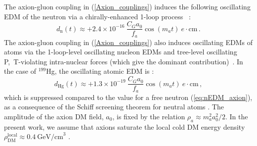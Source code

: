 The axion-gluon coupling in (\ref{Axion_couplings}) induces the following oscillating EDM of the neutron via a chirally-enhanced 1-loop process~%
\cite{tuningfootnote,Witten1979,Witten1979B,Pospelov1999}:
\begin{equation}
\label{eq:nEDM_axion}
d_\mathrm{n}(t) \approx +2.4 \times 10^{-16} ~ \frac{C_G a_0}{f_a} \cos(m_a t) ~ e \cdot \textrm{cm} \, .
\end{equation}
The axion-gluon coupling in (\ref{Axion_couplings}) also induces oscillating EDMs of atoms via the 1-loop-level oscillating nucleon EDMs and tree-level oscillating P,~T-violating intra-nuclear forces (which give the dominant contribution)~\cite{Stadnik2014A,Flambaum1984EDM,Flambaum1984EDMB}.
In the case of $^{199}$Hg, the oscillating atomic EDM is \cite{Stadnik2014A,StadnikThesis,Flambaum1985EDM,Flambaum1985EDMB,Flambaum2002EDM,Dmitriev2003A,Dmitriev2003B,Dmitriev2005,Engel2005,Engel2010}:
\begin{equation}
\label{199Hg-EDM_axion}
d_{\textrm{Hg}}(t) \approx +1.3 \times 10^{-19} ~ \frac{C_G a_0}{f_a} \cos(m_a t) ~ e \cdot \textrm{cm} \, ,
\end{equation}
which is suppressed compared to the value for a free neutron (\ref{eq:nEDM_axion}), as a consequence of the Schiff screening theorem for neutral atoms \cite{Schiff1963}.
The amplitude of the axion DM field, $a_0$, is fixed by the relation $\rho_a \approx m_a^2 a_0^2 /2$.
In the present work, we assume that axions saturate the local cold DM energy density $\rho_{\mathrm{DM}}^{\mathrm{local}} \approx 0.4~\textrm{GeV/cm}^3$ \cite{Catena2010}.






